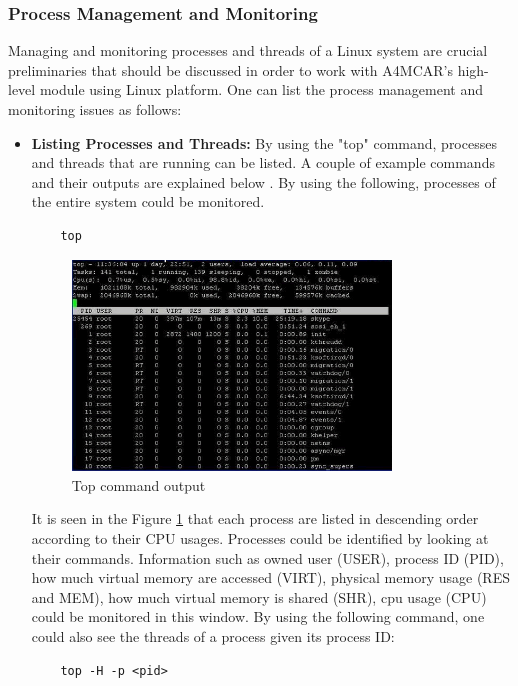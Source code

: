 \subsubsection{Process Management and Monitoring}
Managing and monitoring processes and threads of a Linux system are crucial preliminaries that should be discussed in order to work with A4MCAR's high-level module using Linux platform. One can list the process management and monitoring issues as follows:
\begin{itemize}
	\item \textbf{Listing Processes and Threads:}
	By using the "top" command, processes and threads that are running can be listed. A couple of example commands and their outputs are explained below \cite{topexamples}. By using the following, processes of the entire system could be monitored.
	\begin{lstlisting}
	top
	\end{lstlisting}
	\begin{figure}[!ht]
		\centering
		\includegraphics[width=0.8\textwidth]{content/images/topexample1.png}
		\caption{Top command output}
		\label{fig:topexample1}
	\end{figure}
	It is seen in the Figure \ref{fig:topexample1} that each process are listed in descending order according to their CPU usages. Processes could be identified by looking at their commands. Information such as owned user (USER), process ID (PID), how much virtual memory are accessed (VIRT), physical memory usage (RES and MEM), how much virtual memory is shared (SHR), cpu usage (CPU) could be monitored in this window. By using the following command, one could also see the threads of a process given its process ID:
	\begin{lstlisting}
	top -H -p <pid>
	\end{lstlisting}
	

\end{itemize}
